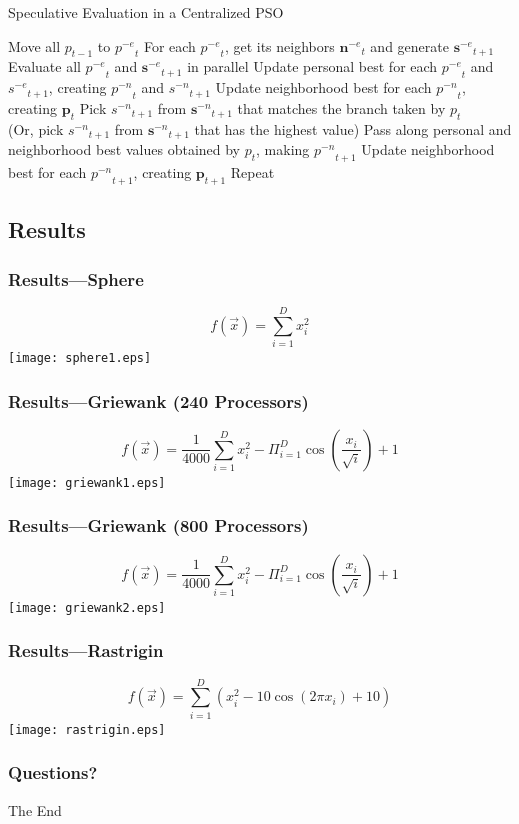 \documentclass{beamer}
\providecommand{\noeval}[1]{\ensuremath{#1^{-e}}}
\providecommand{\nonbest}[1]{\ensuremath{#1^{-n}}}
\providecommand{\p}{\ensuremath{p}}
\providecommand{\pset}{\ensuremath{\mathbf{p}}}
\providecommand{\s}{\ensuremath{s}}
\providecommand{\sset}{\ensuremath{\mathbf{s}}}
\providecommand{\nset}{\ensuremath{\mathbf{n}}}
\begin{document}
\begin{frame}
  \begin{center}
\begin{algorithm}[H]
  \caption{Speculative Evaluation in a Centralized PSO}
  \label{alg:centralized}
  \begin{algorithmic}[1]
	\STATE Move all $\p_{t-1}$ to $\noeval{\p}_t$
	\STATE For each $\noeval{\p}_t$, get its neighbors $\noeval{\nset}_t$ and
	  generate $\noeval{\sset}_{t+1}$
	\STATE Evaluate all $\noeval{\p}_t$ and $\noeval{\sset}_{t+1}$ in parallel
	\STATE Update personal best for each $\noeval{\p}_t$ and
	  $\noeval{\s}_{t+1}$, creating $\nonbest{\p}_t$ and $\nonbest{\s}_{t+1}$
	\STATE Update neighborhood best for each $\nonbest{\p}_t$, creating
	  $\pset_t$
	\FORALL{$\p_t$}
	\STATE Pick $\nonbest{\s}_{t+1}$ from $\nonbest{\sset}_{t+1}$ that matches
	the branch taken by $\p_t$ \\ (Or, pick $\nonbest{\s}_{t+1}$ from
	$\nonbest{\sset}_{t+1}$ that has the highest value)
	\STATE Pass along personal and neighborhood best values obtained by $\p_t$,
	  making $\nonbest{\p}_{t+1}$
	\ENDFOR
	\STATE Update neighborhood best for each $\nonbest{\p}_{t+1}$, creating
	  $\pset_{t+1}$
	\STATE Repeat
  \end{algorithmic}
\end{algorithm}
  \end{center}
\end{frame}

\subsection{Results}
\begin{frame}
  \begin{center}
	\frametitle{Results---Sphere}
	\[f(\Vec{x}) = \sum_{i=1}^D x_i^2\]
	\texttt{[image: sphere1.eps]}
  \end{center}
\end{frame}
\begin{frame}
  \begin{center}
	\frametitle{Results---Griewank (240 Processors)}
	\[f(\Vec{x}) = \frac{1}{4000} \sum_{i=1}^D x_i^2 - \Pi_{i=1}^D 
	\cos\left(\frac{x_i}{\sqrt{i}}\right) + 1\]
	\texttt{[image: griewank1.eps]}
  \end{center}
\end{frame}
\begin{frame}
  \begin{center}
	\frametitle{Results---Griewank (800 Processors)}
	\[f(\Vec{x}) = \frac{1}{4000} \sum_{i=1}^D x_i^2 - \Pi_{i=1}^D 
	\cos\left(\frac{x_i}{\sqrt{i}}\right) + 1\]
	\texttt{[image: griewank2.eps]}
  \end{center}
\end{frame}
\begin{frame}
  \begin{center}
	\frametitle{Results---Rastrigin}
	\[f(\Vec{x}) = \sum_{i=1}^D \left(x_i^2 - 10\cos\left(2\pi x_i\right) +
	10\right)\]
	\texttt{[image: rastrigin.eps]}
  \end{center}
\end{frame}

\begin{frame}
  \frametitle{Questions?}
  \begin{center}
	\Huge \textrm{The End}
  \end{center}
\end{frame}
\end{document}
